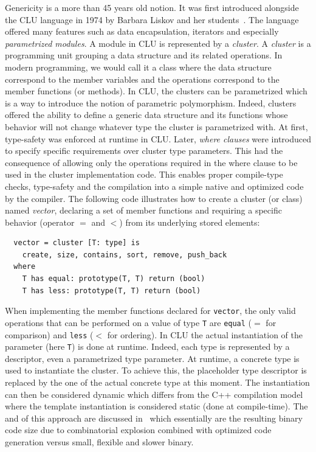 Genericity is a more than 45 years old notion. It was first introduced alongside the CLU language in 1974 by Barbara
Liskov and her students~\parencite{liskov.1993.cluart}. The language offered many features such as data encapsulation,
iterators and especially \emph{parametrized modules}. A module in CLU is represented by a \emph{cluster}. A
\emph{cluster} is a programming unit grouping a data structure and its related operations. In modern programming, we
would call it a class where the data structure correspond to the member variables and the operations correspond to the
member functions (or methods). In CLU, the clusters can be parametrized which is a way to introduce the notion of
parametric polymorphism. Indeed, clusters offered the ability to define a generic data structure and its functions whose
behavior will not change whatever type the cluster is parametrized with. At first, type-safety was enforced at runtime
in CLU. Later, \emph{where clauses} were introduced to specify specific requirements over cluster type parameters. This
had the consequence of allowing only the operations required in the where clause to be used in the cluster
implementation code. This enables proper compile-type checks, type-safety and the compilation into a simple native and
optimized code by the compiler. The following code illustrates how to create a cluster (or class) named \emph{vector},
declaring a set of member functions and requiring a specific behavior (operator \(=\) and \(<\)) from its underlying
stored elements:

\begin{verbatim}
  vector = cluster [T: type] is
    create, size, contains, sort, remove, push_back
  where
    T has equal: prototype(T, T) return (bool)
    T has less: prototype(T, T) return (bool)
\end{verbatim}

When implementing the member functions declared for \texttt{vector}, the only valid operations that can be performed on
a value of type \texttt{T} are \texttt{equal} (\(=\) for comparison) and \texttt{less} (\(<\) for ordering). In CLU the
actual instantiation of the parameter (here \texttt{T}) is done at runtime. Indeed, each type is represented by a
descriptor, even a parametrized type parameter. At runtime, a concrete type is used to instantiate the cluster. To
achieve this, the placeholder type descriptor is replaced by the one of the actual concrete type at this moment. The
instantiation can then be considered dynamic which differs from the C++ compilation model where the template
instantiation is considered static (\ie done at compile-time). The \pros and \cons of this approach are discussed
in~\parencite{atkinson.1978.cluimpl} which essentially are the resulting binary code size due to combinatorial explosion
combined with optimized code generation versus small, flexible and slower binary.

